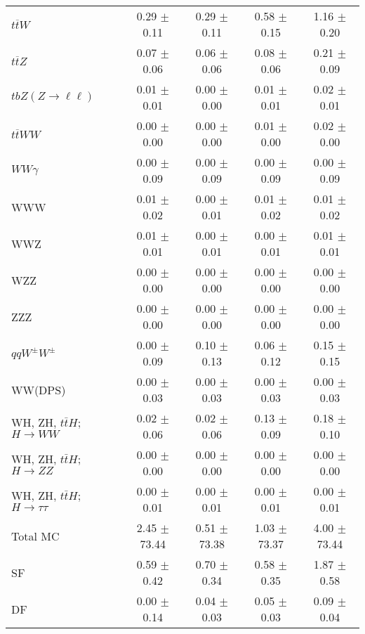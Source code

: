 \begin{tabular}{l|cccc}
                   $t\overline{t}W$ &  0.29 $\pm$  0.11 &  0.29 $\pm$  0.11 &  0.58 $\pm$  0.15 &  1.16 $\pm$  0.20 \\
                   $t\overline{t}Z$ &  0.07 $\pm$  0.06 &  0.06 $\pm$  0.06 &  0.08 $\pm$  0.06 &  0.21 $\pm$  0.09 \\
    $tbZ (Z \rightarrow \ell \ell)$ &  0.01 $\pm$  0.01 &  0.00 $\pm$  0.00 &  0.01 $\pm$  0.01 &  0.02 $\pm$  0.01 \\
                  $t\overline{t}WW$ &  0.00 $\pm$  0.00 &  0.00 $\pm$  0.00 &  0.01 $\pm$  0.00 &  0.02 $\pm$  0.00 \\
                         $WW\gamma$ &  0.00 $\pm$  0.09 &  0.00 $\pm$  0.09 &  0.00 $\pm$  0.09 &  0.00 $\pm$  0.09 \\
                                WWW &  0.01 $\pm$  0.02 &  0.00 $\pm$  0.01 &  0.01 $\pm$  0.02 &  0.01 $\pm$  0.02 \\
                                WWZ &  0.01 $\pm$  0.01 &  0.00 $\pm$  0.01 &  0.00 $\pm$  0.01 &  0.01 $\pm$  0.01 \\
                                WZZ &  0.00 $\pm$  0.00 &  0.00 $\pm$  0.00 &  0.00 $\pm$  0.00 &  0.00 $\pm$  0.00 \\
                                ZZZ &  0.00 $\pm$  0.00 &  0.00 $\pm$  0.00 &  0.00 $\pm$  0.00 &  0.00 $\pm$  0.00 \\
                 $qqW^{\pm}W^{\pm}$ &  0.00 $\pm$  0.09 &  0.10 $\pm$  0.13 &  0.06 $\pm$  0.12 &  0.15 $\pm$  0.15 \\
                            WW(DPS) &  0.00 $\pm$  0.03 &  0.00 $\pm$  0.03 &  0.00 $\pm$  0.03 &  0.00 $\pm$  0.03 \\
WH, ZH, $t\bar{t}H$; $H \rightarrow WW$ &  0.02 $\pm$  0.06 &  0.02 $\pm$  0.06 &  0.13 $\pm$  0.09 &  0.18 $\pm$  0.10 \\
WH, ZH, $t\bar{t}H$; $H \rightarrow ZZ$ &  0.00 $\pm$  0.00 &  0.00 $\pm$  0.00 &  0.00 $\pm$  0.00 &  0.00 $\pm$  0.00 \\
WH, ZH, $t\bar{t}H$; $H \rightarrow \tau\tau$ &  0.00 $\pm$  0.01 &  0.00 $\pm$  0.01 &  0.00 $\pm$  0.01 &  0.00 $\pm$  0.01 \\
\hline\hline
                           Total MC &  2.45 $\pm$ 73.44 &  0.51 $\pm$ 73.38 &  1.03 $\pm$ 73.37 &  4.00 $\pm$ 73.44 \\
\hline
                                 SF &  0.59 $\pm$  0.42 &  0.70 $\pm$  0.34 &  0.58 $\pm$  0.35 &  1.87 $\pm$  0.58 \\
                                 DF &  0.00 $\pm$  0.14 &  0.04 $\pm$  0.03 &  0.05 $\pm$  0.03 &  0.09 $\pm$  0.04 \\

\end{tabular}
